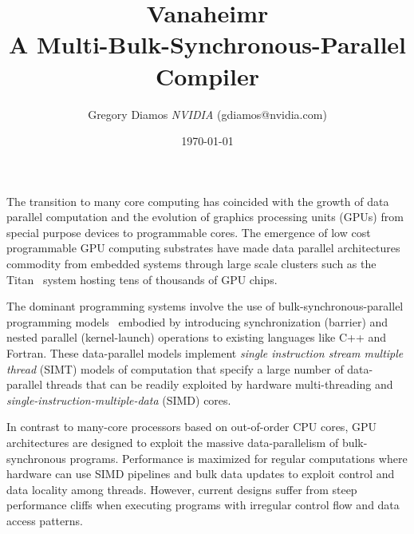 \documentclass[conference, 10pt]{IEEEtran}
\begin{document}
 

\title{Vanaheimr\\
A Multi-Bulk-Synchronous-Parallel Compiler
}

\author{Gregory Diamos \textit{NVIDIA} ({\small gdiamos@nvidia.com})}
\date{\today}

\maketitle


The transition to many core computing has coincided with the growth of
data parallel computation and the evolution of graphics processing
units (GPUs) from special purpose devices to programmable cores. 
The emergence of low cost programmable GPU computing substrates
have made data parallel architectures commodity
from embedded systems through large scale clusters such as the
Titan~\cite{ref:titan} system hosting tens of thousands of GPU chips.

The dominant programming systems involve the use of
bulk-synchronous-parallel programming models~\cite{ref:bulk-synchronous}
embodied by introducing synchronization (barrier) and nested parallel (kernel-launch)
operations to existing languages like C++ and Fortran.  These data-parallel
models implement \textit{single instruction stream multiple thread} (SIMT)
models of computation that specify a large number of
data-parallel threads that can be readily exploited by hardware
multi-threading and \textit{single-instruction-multiple-data} (SIMD)
cores. 

In contrast to many-core processors based on out-of-order CPU cores,
GPU architectures are designed to exploit the massive data-parallelism of
bulk-synchronous programs. Performance is maximized for regular computations
where hardware can use SIMD pipelines and bulk data updates to exploit
control and data locality among threads.  However, current designs suffer
from steep performance cliffs when executing programs with irregular control
flow and data access patterns.  
\end{document}
